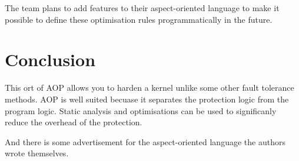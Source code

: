 \documentclass[paper=a4, fontsize=11pt]{scrartcl} %
\numberwithin{equation}{section} %
\numberwithin{figure}{section} %
\numberwithin{table}{section} %
\begin{document}
The team plans to add features to their aspect-oriented language to make it possible to define these optimisation rules programmatically in the future.

\section{Conclusion}

This ort of AOP allows you to harden a kernel unlike some other fault tolerance methods.
AOP is well suited becuase it separates the protection logic from the program logic.
Static analysis and optimisations can be used to significanly reduce the overhead of the protection.

And there is some advertisement for the aspect-oriented language the authors wrote themselves.
\end{document}
